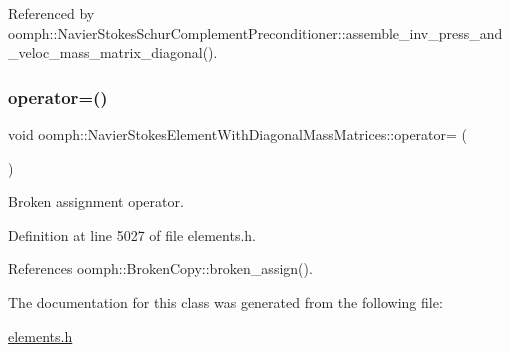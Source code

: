 Referenced by oomph\+::\+Navier\+Stokes\+Schur\+Complement\+Preconditioner\+::assemble\+\_\+inv\+\_\+press\+\_\+and\+\_\+veloc\+\_\+mass\+\_\+matrix\+\_\+diagonal().

\mbox{\label{classoomph_1_1NavierStokesElementWithDiagonalMassMatrices_acb74c30ee5f69d85a27833f49d2594a6}} 
\subsubsection{\texorpdfstring{operator=()}{operator=()}}
{\footnotesize\ttfamily void oomph\+::\+Navier\+Stokes\+Element\+With\+Diagonal\+Mass\+Matrices\+::operator= (\begin{DoxyParamCaption}\item[{const \hyperlink{classoomph_1_1NavierStokesElementWithDiagonalMassMatrices}{Navier\+Stokes\+Element\+With\+Diagonal\+Mass\+Matrices} \&}]{ }\end{DoxyParamCaption})\hspace{0.3cm}{\ttfamily [inline]}}



Broken assignment operator. 



Definition at line 5027 of file elements.\+h.



References oomph\+::\+Broken\+Copy\+::broken\+\_\+assign().



The documentation for this class was generated from the following file\+:\begin{DoxyCompactItemize}
\item 
\hyperlink{elements_8h}{elements.\+h}\end{DoxyCompactItemize}
